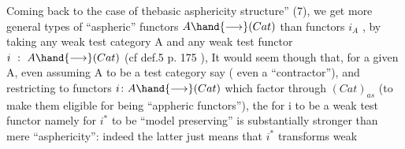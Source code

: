 Coming back to the case of thebasic asphericity structure'' (7),
we get more general types of ``aspheric'' functors $A \hand{\longrightarrow} (Cat)$ than functors
$i_A$ , by taking any weak test category A and any weak test functor
$i \ : \ A \hand{\longrightarrow} (Cat)$ (cf def.5 p. 175 ), It would seem though that,
for a given A, even assuming A to be a \hand{\uline{\textcolor{black}{strict}}} test category say ( even
a ``contractor''),  and restricting to functors
$i\colon A \hand{\longrightarrow} (Cat)$ which factor through $(Cat)_{as}$ (to make them eligible for
being ``appheric functors''), the  for i to be a weak test functor\hand{,}
namely for $i^{*}$ to be ``model preserving''\hand{,} is substantially stronger than
mere ``asphericity'': indeed the latter just means that $i^{*}$ transforms weak

